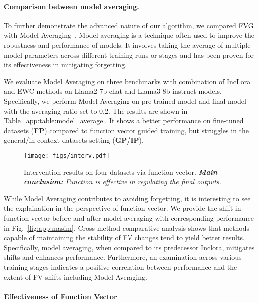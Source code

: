 \paragraph{Comparison between model averaging.}
To further demonstrate the advanced nature of our algorithm, we compared FVG with Model Averaging~\citep{lin2024mitigating}. Model averaging is a technique often used to improve the robustness and performance of models. It involves taking the average of multiple model parameters across different training runs or stages and has been proven for its effectiveness in mitigating forgetting. 

We evaluate Model Averaging on three benchmarks with combination of IncLora and EWC methods on Llama2-7b-chat and Llama3-8b-instruct models. Specifically, we perform Model Averaging on pre-trained model and final model with the averaging ratio set to 0.2. The results are shown in Table~\ref{app:table:model_average}. It shows a better performance on fine-tuned datasets (\textbf{FP}) compared to function vector guided training, but struggles in the general/in-context datasets setting (\textbf{GP/IP}).

\begin{wrapfigure}{hr}{0.45\textwidth}
  \centering
  \vspace{-1.8em}
  \texttt{[image: figs/interv.pdf]}
  \vspace{-2em}
  \caption{Intervention results on four datasets via function vector. \textit{\textbf{Main conclusion:} Function is effective in regulating the final outputs.}}
  \label{fig:app:intervention}
  \vspace{-1.0em}
\end{wrapfigure}

 While Model Averaging contributes to avoiding forgetting, it is interesting to see the explaination in the perspective of function vector. We provide the shift in function vector before and after model averaging with corresponding performance in Fig.~\ref{fig:app:masim}. Cross-method comparative analysis shows that methods capable of maintaining the stability of FV changes tend to yield better results. Specifically, model averaging, when compared to its predecessor Inclora, mitigates shifts and enhances performance. Furthermore, an examination across various training stages indicates a positive correlation between performance and the extent of FV shifts including Model Averaging.
 

\paragraph{Effectiveness of Function Vector}
\label{app:fv}



